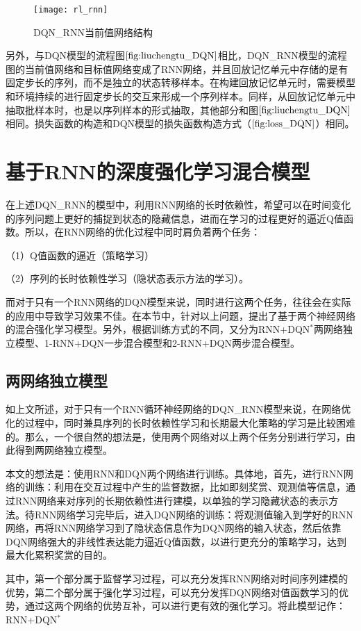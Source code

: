  \begin{figure}[htbp]
 \centering
 \texttt{[image: rl\_rnn]}
 \caption{DQN_RNN当前值网络结构}
 \label{fig:rl_rnn}
 \end{figure}

 另外，与DQN模型的流程图$\ref{fig:liuchengtu_DQN}$相比，DQN\_RNN模型的流程图的当前值网络和目标值网络变成了RNN网络，并且回放记忆单元中存储的是有固定步长的序列，而不是独立的状态转移样本。在构建回放记忆单元时，需要模型和环境持续的进行固定步长的交互来形成一个序列样本。同样，从回放记忆单元中抽取批样本时，也是以序列样本的形式抽取，其他部分和图$\ref{fig:liuchengtu_DQN}$相同。损失函数的构造和DQN模型的损失函数构造方式（$\ref{fig:loss_DQN}$）相同。

\section{基于RNN的深度强化学习混合模型}
在上述DQN\_RNN的模型中，利用RNN网络的长时依赖性，希望可以在时间变化的序列问题上更好的捕捉到状态的隐藏信息，进而在学习的过程更好的逼近Q值函数。所以，在RNN网络的优化过程中同时肩负着两个任务：

（1）Q值函数的逼近（策略学习）

（2）序列的长时依赖性学习（隐状态表示方法的学习）。

而对于只有一个RNN网络的DQN模型来说，同时进行这两个任务，往往会在实际的应用中导致学习效果不佳。在本节中，针对以上问题，提出了基于两个神经网络的混合强化学习模型。另外，根据训练方式的不同，又分为RNN+DQN$^{*}$两网络独立模型、1-RNN+DQN一步混合模型和2-RNN+DQN两步混合模型。

\subsection{两网络独立模型}
如上文所述，对于只有一个RNN循环神经网络的DQN\_RNN模型来说，在网络优化的过程中，同时兼具序列的长时依赖性学习和长期最大化策略的学习是比较困难的。那么，一个很自然的想法是，使用两个网络对以上两个任务分别进行学习，由此得到两网络独立模型。

本文的想法是：使用RNN和DQN两个网络进行训练。具体地，首先，进行RNN网络的训练：利用在交互过程中产生的监督数据，比如即刻奖赏、观测值等信息，通过RNN网络来对序列的长期依赖性进行建模，以单独的学习隐藏状态的表示方法。待RNN网络学习完毕后，进入DQN网络的训练：将观测值输入到学好的RNN网络，再将RNN网络学习到了隐状态信息作为DQN网络的输入状态，然后依靠DQN网络强大的非线性表达能力逼近Q值函数，以进行更充分的策略学习，达到最大化累积奖赏的目的。

其中，第一个部分属于监督学习过程，可以充分发挥RNN网络对时间序列建模的优势，第二个部分属于强化学习过程，可以充分发挥DQN网络对值函数学习的优势，通过这两个网络的优势互补，可以进行更有效的强化学习。将此模型记作：RNN+DQN$^{*}$

